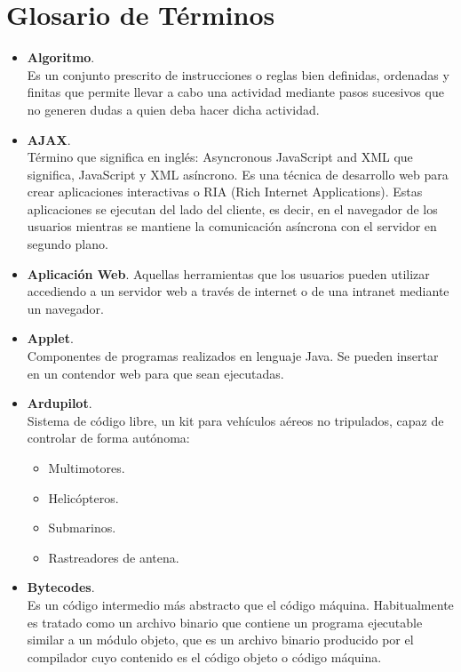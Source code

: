 \section{Glosario de Términos}

%

\begin{itemize}
	\item \textbf{Algoritmo}. \\
 Es un conjunto prescrito de instrucciones o reglas bien definidas, ordenadas y 
finitas que permite llevar a cabo una actividad mediante pasos sucesivos que no 
generen dudas a quien deba hacer dicha actividad.

	\item \textbf{AJAX}. \\
Término que significa en inglés: Asyncronous JavaScript and XML que significa, 
JavaScript y XML asíncrono. Es una técnica de desarrollo web para crear 
aplicaciones interactivas o RIA (Rich Internet Applications). Estas aplicaciones 
se ejecutan del lado del cliente, es decir, en el navegador de los usuarios 
mientras se mantiene la comunicación asíncrona con el servidor en segundo plano.

	\item \textbf{Aplicación Web}.
 Aquellas herramientas que los usuarios pueden utilizar accediendo a un servidor 
web a través de internet o de una intranet mediante un navegador.

	\item \textbf{Applet}. \\
Componentes de programas realizados en lenguaje Java. Se pueden insertar en un 
contendor web para que sean ejecutadas.

	\item \textbf{Ardupilot}. \\
Sistema de código libre, un kit para vehículos aéreos no tripulados, capaz de 
controlar de forma autónoma:
\begin {itemize}
	\item Multimotores.
	\item Helicópteros.
	\item Submarinos.
	\item Rastreadores de antena.
\end{itemize}

	\item \textbf{Bytecodes}. \\
Es un código intermedio más abstracto que el código máquina. Habitualmente es 
tratado como un archivo binario que contiene un programa ejecutable similar a un 
módulo objeto, que es un archivo binario producido por el compilador cuyo 
contenido es el código objeto o código máquina.


\end{itemize}
